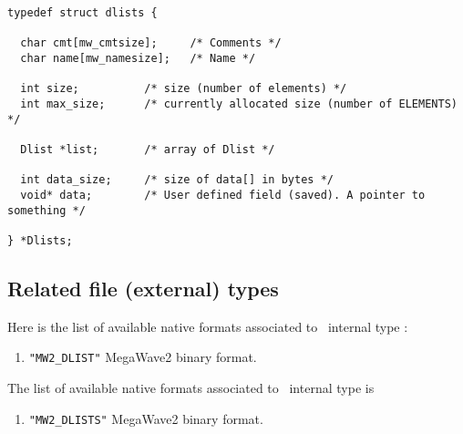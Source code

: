 {\small
\begin{verbatim}
typedef struct dlists {

  char cmt[mw_cmtsize];     /* Comments */
  char name[mw_namesize];   /* Name */

  int size;          /* size (number of elements) */
  int max_size;      /* currently allocated size (number of ELEMENTS) */

  Dlist *list;       /* array of Dlist */

  int data_size;     /* size of data[] in bytes */
  void* data;        /* User defined field (saved). A pointer to something */

} *Dlists;

\end{verbatim}
}


\subsection{Related file (external) types}
\label{curves-polygons_dlist-dlists-file_type}

Here is the list of available native formats associated to \dlist\ internal type :
\begin{enumerate}
\item \verb+"MW2_DLIST"+ MegaWave2 binary format.
\end{enumerate}

The list of available native formats associated to \dlists\ internal type is
\begin{enumerate}
\item \verb+"MW2_DLISTS"+ MegaWave2 binary format.
\end{enumerate}
